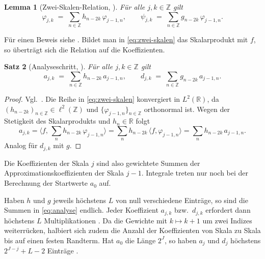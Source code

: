 \documentclass[a4paper,11pt,bibliography=totoc,listof=totoc,headinclude=true,cleardoublepage=empty,oneside]{scrbook}
\theoremstyle{plain}
\newtheorem{Satz}{Satz}[chapter]
\newtheorem{Lemma}[Satz]{Lemma}
\theoremstyle{definition}
\newcommand{\R}{\mathbb{R}}
\newcommand{\Z}{\mathbb{Z}}
\newcommand{\LZwei}{L^2(\R)}
\newcommand{\ellZwei}{\ell^2(\Z)}
\newcommand{\scal}[2]{\langle #1, #2 \rangle}
\begin{document}
\begin{Lemma}[Zwei-Skalen-Relation, {\cite[Kap.~5.4, (3), (4)]{blatter}}] %
\label{lem:zwei-skalen}
Für alle $j,k\in\Z$ gilt
\begin{equation}
\label{eq:zwei-skalen}
  \varphi_{j,k} \;=\; \sum_{n\in\Z} h_{n-2k}\,\varphi_{j-1,n},
  \qquad
  \psi_{j,k} \;=\; \sum_{n\in\Z} g_{n-2k}\,\varphi_{j-1,n} .
\end{equation}
\end{Lemma}

Für einen Beweis siehe \cite[Kap.~5.4]{blatter}. %
Bildet man in \eqref{eq:zwei-skalen} das Skalarprodukt mit $f$, so überträgt
sich die Relation auf die Koeffizienten.

\begin{Satz}[Analyseschritt, {\cite[Kap.~5.4]{blatter}}] %
\label{satz:analyse}
Für alle $j,k\in\Z$ gilt
\begin{equation}
\label{eq:analyse}
  a_{j,k} \;=\; \sum_{n\in\Z} h_{n-2k}\,a_{j-1,n},
  \qquad
  d_{j,k} \;=\; \sum_{n\in\Z} g_{n-2k}\,a_{j-1,n}.
\end{equation}
\end{Satz}

\begin{proof}
Vgl.\ \cite[Kap.~5.4]{blatter}. %
Die Reihe in \eqref{eq:zwei-skalen} konvergiert in $\LZwei$, da
$(h_{n-2k})_{n\in\Z}\in\ellZwei$ und $\{\varphi_{j-1,n}\}_{n\in\Z}$
orthonormal ist. Wegen der Stetigkeit des Skalarprodukts und $h_n\in\R$ folgt
\[
  a_{j,k}
  = \Big\langle f,\, \sum_{n} h_{n-2k}\,\varphi_{j-1,n}\Big\rangle
  = \sum_{n} h_{n-2k}\,\scal{f}{\varphi_{j-1,n}}
  = \sum_{n} h_{n-2k}\,a_{j-1,n}.
\]
Analog für $d_{j,k}$ mit $g$.
\end{proof}

Die Koeffizienten der Skala $j$ sind also gewichtete Summen der
Approximationskoeffizienten der Skala $j-1$. Integrale treten nur noch bei der
Berechnung der Startwerte $a_0$ auf.

Haben $h$ und $g$ jeweils höchstens $L$ von null verschiedene Einträge, so sind
die Summen in \eqref{eq:analyse} endlich. Jeder Koeffizient $a_{j,k}$ bzw.\
$d_{j,k}$ erfordert dann höchstens $L$ Multiplikationen
\cite[Kap.~5.4]{blatter}. %
Da die Gewichte mit $k\mapsto k+1$ um zwei Indizes weiterrücken, halbiert sich
zudem die Anzahl der Koeffizienten von Skala zu Skala bis auf einen festen
Randterm. Hat $a_0$ die Länge $2^J$, so haben $a_j$ und $d_j$ höchstens
$2^{J-j} + L - 2$ Einträge \cite[Kap.~5.4]{blatter}. %
\end{document}
